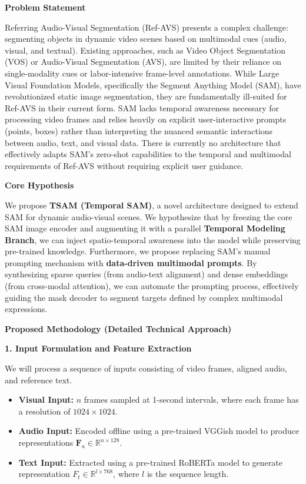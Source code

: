 \noindent\textbf{Problem Statement}

Referring Audio-Visual Segmentation (Ref-AVS) presents a complex challenge: segmenting objects in dynamic video scenes based on multimodal cues (audio, visual, and textual). Existing approaches, such as Video Object Segmentation (VOS) or Audio-Visual Segmentation (AVS), are limited by their reliance on single-modality cues or labor-intensive frame-level annotations. While Large Visual Foundation Models, specifically the Segment Anything Model (SAM), have revolutionized static image segmentation, they are fundamentally ill-suited for Ref-AVS in their current form. SAM lacks temporal awareness necessary for processing video frames and relies heavily on explicit user-interactive prompts (points, boxes) rather than interpreting the nuanced semantic interactions between audio, text, and visual data. There is currently no architecture that effectively adapts SAM's zero-shot capabilities to the temporal and multimodal requirements of Ref-AVS without requiring explicit user guidance.

\vspace{1em}
\noindent\textbf{Core Hypothesis}

We propose \textbf{TSAM (Temporal SAM)}, a novel architecture designed to extend SAM for dynamic audio-visual scenes. We hypothesize that by freezing the core SAM image encoder and augmenting it with a parallel \textbf{Temporal Modeling Branch}, we can inject spatio-temporal awareness into the model while preserving pre-trained knowledge. Furthermore, we propose replacing SAM's manual prompting mechanism with \textbf{data-driven multimodal prompts}. By synthesizing sparse queries (from audio-text alignment) and dense embeddings (from cross-modal attention), we can automate the prompting process, effectively guiding the mask decoder to segment targets defined by complex multimodal expressions.

\vspace{1em}
\noindent\textbf{Proposed Methodology (Detailed Technical Approach)}

\vspace{0.5em}
\noindent\textbf{1. Input Formulation and Feature Extraction}

We will process a sequence of inputs consisting of video frames, aligned audio, and reference text.
\begin{itemize}
    \item \textbf{Visual Input:} $n$ frames sampled at 1-second intervals, where each frame has a resolution of $1024 \times 1024$.
    \item \textbf{Audio Input:} Encoded offline using a pre-trained VGGish model to produce representations $\boldsymbol{F}_{a} \in \mathbb{R}^{n \times 128}$.
    \item \textbf{Text Input:} Extracted using a pre-trained RoBERTa model to generate representation $F_{t} \in \mathbb{R}^{l \times 768}$, where $l$ is the sequence length.
\end{itemize}

